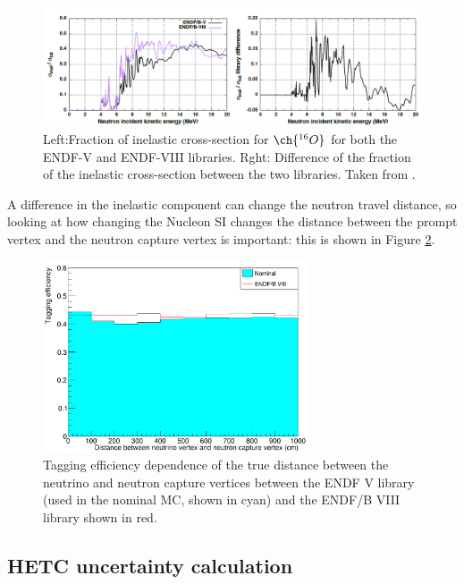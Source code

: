 \begin{figure}[!htb]
    \centering
    \includegraphics[width=\textwidth]{Figures/neutron_cross_section_endf_O.PNG}
\caption{Left:Fraction of inelastic cross-section for $\ch{^{16}O}$ for both the ENDF-V and ENDF-VIII libraries. Rght: Difference of the fraction of the inelastic cross-section between the two libraries. Taken from \cite{tn415_fiacob}.}
\label{fig:neutron_cross_section_O}
\end{figure}

A difference in the inelastic component can change the neutron travel distance, so looking at how changing the Nucleon SI changes the distance between the prompt vertex and the neutron capture vertex is important: this is shown in Figure \ref{fig:ENDF8_syst_error}.

\begin{figure}[!htb]
\centering
    \includegraphics[width=0.7\textwidth]{Figures/endf8_tageff_plot.PNG}
\caption{Tagging efficiency dependence of the true distance between the neutrino and neutron capture vertices between the ENDF V library (used in the nominal MC, shown in cyan) and the ENDF/B VIII library shown in red.}
\label{fig:ENDF8_syst_error}
\end{figure}

\subsection{HETC uncertainty calculation}

